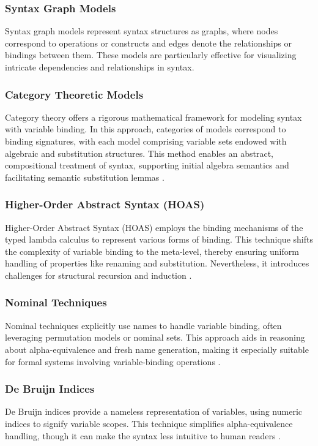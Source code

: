 \documentclass[a4paper,UKenglish,cleveref,autoref,thm-restate]{lipics-v2021}
\begin{document}
\subsubsection{Syntax Graph Models}
Syntax graph models represent syntax structures as graphs, where nodes
correspond to operations or constructs and edges denote the relationships or
bindings between them. These models are particularly effective for visualizing
intricate dependencies and relationships in syntax.

\subsubsection{Category Theoretic Models}
Category theory offers a rigorous mathematical framework for modeling syntax
with variable binding. In this approach, categories of models correspond to
binding signatures, with each model comprising variable sets endowed with
algebraic and substitution structures. This method enables an abstract,
compositional treatment of syntax, supporting initial algebra semantics and
facilitating semantic substitution lemmas \cite{fiore99cat}.

\subsubsection{Higher-Order Abstract Syntax (HOAS)}
Higher-Order Abstract Syntax (HOAS) employs the binding mechanisms of the typed
lambda calculus to represent various forms of binding. This technique shifts the
complexity of variable binding to the meta-level, thereby ensuring uniform
handling of properties like renaming and substitution. Nevertheless, it
introduces challenges for structural recursion and induction \cite{gabbay02hoas}.

\subsubsection{Nominal Techniques}
Nominal techniques explicitly use names to handle variable binding, often
leveraging permutation models or nominal sets. This approach aids in reasoning
about alpha-equivalence and fresh name generation, making it especially suitable
for formal systems involving variable-binding operations \cite{pitts16nominal}.

\subsubsection{De Bruijn Indices}
De Bruijn indices provide a nameless representation of variables, using numeric
indices to signify variable scopes. This technique simplifies alpha-equivalence
handling, though it can make the syntax less intuitive to human readers
\cite{bruijn72lambda}.
\end{document}
